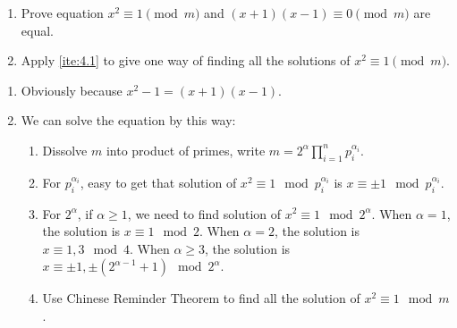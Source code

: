 \documentclass{ctexart}
\begin{document}
\begin{problem}\label{pro:4}
  \begin{enumerate}
    \item \label{ite:4.1} Prove equation \(x^2 \equiv 1 \pmod{m}\) and \((x + 1)(x-1) \equiv 0 \pmod{m}\) are equal.
    \item Apply \ref{ite:4.1} to give one way of finding all the solutions of \(x^2 \equiv 1 \pmod{m}\).
  \end{enumerate}
\end{problem}
\begin{solution}
  \begin{enumerate}
    \item Obviously because \(x^2-1=(x+1)(x-1)\).
    \item We can solve the equation by this way:
      \begin{enumerate}
        \item Dissolve \(m\) into product of primes, write \(m=2^{\alpha}\prod_{i=1}^{n} p_i^{\alpha_i}\).
        \item For \(p_i^{\alpha_i}\), easy to get that solution of \(x^2 \equiv 1 \mod p_i^{\alpha_i}\) is \(x \equiv \pm 1 \mod p_i^{\alpha_i}\).
        \item For \(2^\alpha\), if \(\alpha \geq 1\), we need to find solution of \(x^2 \equiv 1 \mod 2^\alpha\).
          When \(\alpha=1\), the solution is \(x \equiv 1 \mod 2\).
          When \(\alpha=2\), the solution is \(x \equiv 1,3 \mod 4\).
          When \(\alpha \geq 3\), the solution is \(x \equiv \pm 1,\pm (2^{\alpha-1}+1) \mod 2^\alpha\).
        \item Use Chinese Reminder Theorem to find all the solution of \(x^2 \equiv 1 \mod m\).
      \end{enumerate}
  \end{enumerate}
\end{solution}
\end{document}
